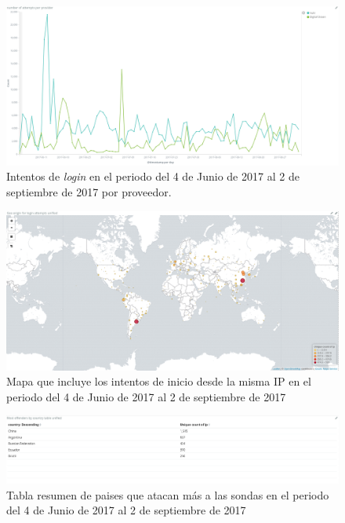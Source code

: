   \begin{figure}[h]
    \centering
      \includegraphics[scale=0.3]{images/ElasticAttemptsPerProvider}
    \caption{Intentos de \emph{login} en el periodo del 4 de Junio de 2017 al 2 de septiembre de 2017 por proveedor.}
    \label{fig:data-attempts-per-provider}
  \end{figure}

  \begin{figure}[h]
    \centering
      \includegraphics[scale=0.3]{images/ElasticMapUnified}
    \caption{Mapa que incluye los intentos de inicio desde la misma IP en el periodo del 4 de Junio de 2017 al 2 de septiembre de 2017}
    \label{fig:data-map-unified}
  \end{figure}

  \begin{figure}[h]
    \centering
      \includegraphics[scale=0.3]{images/ElasticTableByCountryUnified}
    \caption{Tabla resumen de paises que atacan más a las sondas en el periodo del 4 de Junio de 2017 al 2 de septiembre de 2017}
    \label{fig:data-table-by-country-unified}
  \end{figure}

